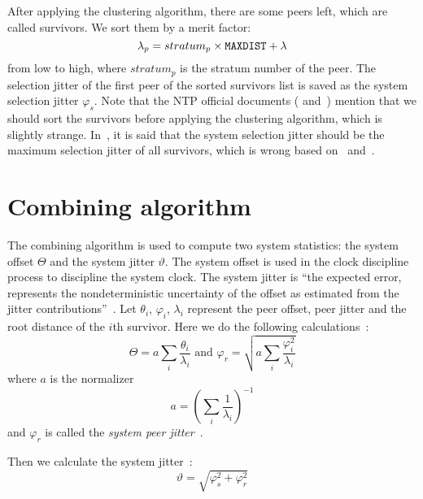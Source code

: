After applying the clustering algorithm, there are some peers left, which are
called survivors. We sort them by a merit factor:
\begin{equation}
    \lambda_p = stratum_p \times \verb|MAXDIST| + \lambda
    \label{eq:merit_factor}
\end{equation}
from low to high, where $stratum_p$ is the stratum
number of the peer. The selection jitter of the first peer of the sorted
survivors list is saved as the system selection jitter $\varphi_s$. Note that
the NTP official documents (\cite{redbook} and~\cite{rfc5905}) mention that we
should sort the survivors before applying the clustering algorithm, which is
slightly strange. In~\cite{rfc5905}, it is said that the system selection
jitter should be the maximum selection jitter of all survivors, which is wrong
based on~\cite{redbook} and~\cite{source_code}.

\section{Combining algorithm}%
\label{sec:combine_algorithm}
The combining algorithm is used to compute two system statistics: the system
offset $\Theta$ and the system jitter $\vartheta$. The system offset is used
in the clock discipline process to discipline the system clock. The system
jitter is ``the expected error, represents the nondeterministic uncertainty of
the offset as estimated from the jitter contributions''~\cite{redbook}.
Let $\theta_i$, $\varphi_i$,
$\lambda_i$ represent the peer offset, peer jitter and the root distance of the
$i$th survivor. Here we do the following calculations~\cite{redbook}:
\begin{equation}
    \Theta = a \sum^{}_{i} \frac{\theta_i}{\lambda_i} \text{ and } 
    \varphi_r = \sqrt{a \sum^{}_{i} \frac{\varphi_i ^ 2}{\lambda_i}}
    \label{eq:system_offset_selection_jitter}
\end{equation}
where $a$ is the normalizer
\begin{equation}
    a = \left( \sum^{}_{i} \frac{1}{\lambda_i} \right) ^ {-1}
    \label{eq:normalizer}
\end{equation}
and $\varphi_r$ is called the \emph{system peer jitter}~\cite{rfc5905}.

Then we calculate the system jitter~\cite{redbook}:
\begin{equation}
    \vartheta = \sqrt{\varphi_s^2 + \varphi_r^2}
    \label{eq:system_jitter}
\end{equation}

